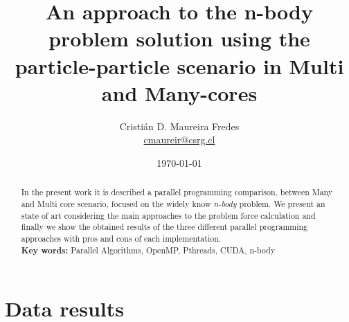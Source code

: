 \documentclass[letter, 10pt]{article}
\begin{document}
\pagestyle{empty}

\title{An approach to the n-body problem solution using the particle-particle scenario in Multi and Many-cores}
\author{Cristián D. Maureira Fredes\\\url{cmaureir@csrg.cl}}
\date{\today}

\maketitle
\begin{abstract}
In the present work it is described a parallel programming
comparison, between Many and Multi core scenario,
focused on the widely know \emph{n-body} problem.
We present an state of art considering the main approaches to
the problem force calculation and finally
we show the obtained results of the three different
parallel programming approaches with pros and cons
of each implementation.
\\
\textbf{Key words:} Parallel Algorithms, OpenMP, Pthreads, CUDA, n-body

\end{abstract}

%
%
%
%
%
%
%
%
%
%
%
%
%
%
%

\section{Data results}

\end{document}

